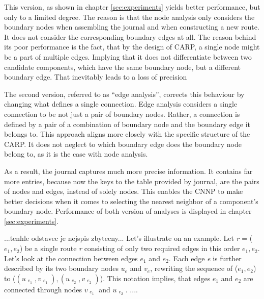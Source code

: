 \documentclass[twoside]{ctuthesis}
\theoremstyle{plain}
\theoremstyle{definition}
\theoremstyle{note}
\begin{document}
This version, as shown in chapter \ref{sec:experiments} yields better performance, but only to a limited degree. The reason is that the node analysis only considers the boundary nodes when assembling the journal and when constructing a new route. It does not consider the corresponding boundary edges at all. The reason behind its poor performance is the fact, that by the design of CARP, a single node might be a part of multiple edges. Implying that it does not differentiate between two candidate components, which have the same boundary node, but a different boundary edge. That inevitably leads to a loss of precision

The second version, referred to as ``edge analysis'', corrects this behaviour by changing what defines a single connection. Edge analysis considers a single connection to be not just a pair of boundary nodes. Rather, a connection is defined by a pair of a combination of boundary node and the boundary edge it belongs to. This approach aligns more closely with the specific structure of the CARP. It does not neglect to which boundary edge does the boundary node belong to, as it is the case with node analysis.

As a result, the journal captures much more precise information. It contains far more entries, because now the keys to the table provided by journal, are the pairs of nodes and edges, instead of solely nodes. 
This enables the CNNP to make better decisions when it comes to selecting the nearest neighbor of a component's boundary node.
Performance of both version of analyses is displayed in chapter \ref{sec:experiments}.



...tenhle odstavec je nejspis zbytecny...
Let's illustrate on an example. Let \emph{r} = (\emph{$e_1, e_2$}) be a single route \emph{r} consisting of only two required edges in this order \emph{$e_1, e_2$}. Let's look at the connection between edges \emph{$e_1$} and \emph{$e_2$}. Each edge \emph{e} is further described by its two boundary nodes \emph{$u_e$} and \emph{$v_e$}, rewriting the sequence of (\emph{$e_1, e_2$}) to (\emph{$(u_{\substack{e_1}}, v_{\substack{e_1}}), (u_{\substack{e_2}}, v_{\substack{e_2}}) $}). This notation implies, that edges \emph{$e_1$} and \emph{$e_2$} are connected through nodes \emph{$v_{\substack{e_1}}$} and \emph{$u_{\substack{e_2}}$}. ....
\end{document}
